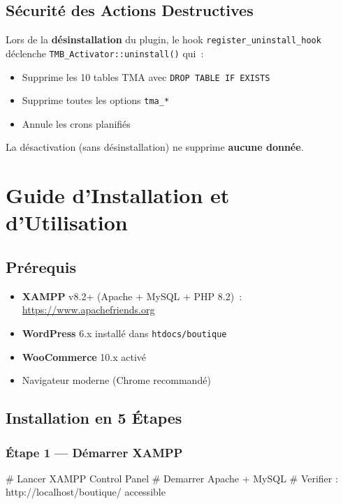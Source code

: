 \documentclass[12pt,a4paper]{report}
\begin{document}
\section{S\'ecurit\'e des Actions Destructives}

Lors de la \textbf{d\'esinstallation} du plugin, le hook \texttt{register\_uninstall\_hook}
d\'eclenche \texttt{TMB\_Activator::uninstall()} qui~:
\begin{itemize}
  \item Supprime les 10 tables TMA avec \texttt{DROP TABLE IF EXISTS}
  \item Supprime toutes les options \texttt{tma\_*}
  \item Annule les crons planifi\'es
\end{itemize}

La d\'esactivation (sans d\'esinstallation) ne supprime \textbf{aucune donn\'ee}.

\chapter{Guide d'Installation et d'Utilisation}

\section{Pr\'erequis}

\begin{itemize}
  \item \textbf{XAMPP} v8.2+ (Apache + MySQL + PHP 8.2)~: \url{https://www.apachefriends.org}
  \item \textbf{WordPress} 6.x install\'e dans \texttt{htdocs/boutique}
  \item \textbf{WooCommerce} 10.x activ\'e
  \item Navigateur moderne (Chrome recommand\'e)
\end{itemize}

\section{Installation en 5 \'Etapes}

\subsection{\'Etape 1 --- D\'emarrer XAMPP}

\begin{shellbox}
# Lancer XAMPP Control Panel
# Demarrer Apache + MySQL
# Verifier : http://localhost/boutique/ accessible
\end{shellbox}
\end{document}
